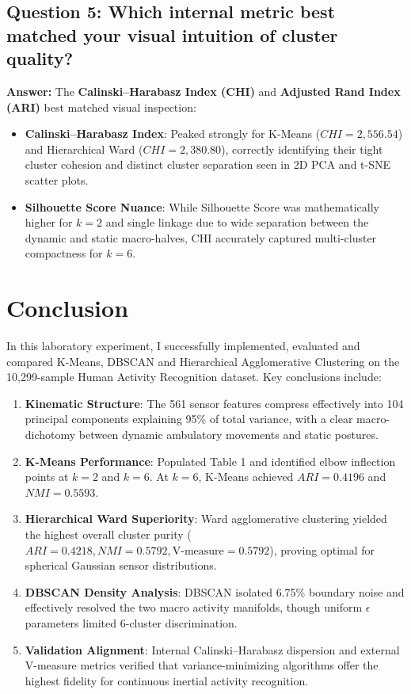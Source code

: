 \documentclass[12pt,a4paper]{article}
\begin{document}
\subsection*{Question 5: Which internal metric best matched your visual intuition of cluster quality?}
\textbf{Answer:} The \textbf{Calinski--Harabasz Index (CHI)} and \textbf{Adjusted Rand Index (ARI)} best matched visual inspection:
\begin{itemize}
\item \textbf{Calinski--Harabasz Index}: Peaked strongly for K-Means ($CHI = 2,556.54$) and Hierarchical Ward ($CHI = 2,380.80$), correctly identifying their tight cluster cohesion and distinct cluster separation seen in 2D PCA and t-SNE scatter plots.
\item \textbf{Silhouette Score Nuance}: While Silhouette Score was mathematically higher for $k=2$ and single linkage due to wide separation between the dynamic and static macro-halves, CHI accurately captured multi-cluster compactness for $k=6$.
\end{itemize}

\section{Conclusion}
In this laboratory experiment, I successfully implemented, evaluated and compared K-Means, DBSCAN and Hierarchical Agglomerative Clustering on the 10,299-sample Human Activity Recognition dataset. Key conclusions include:
\begin{enumerate}
\item \textbf{Kinematic Structure}: The 561 sensor features compress effectively into 104 principal components explaining 95\% of total variance, with a clear macro-dichotomy between dynamic ambulatory movements and static postures.
\item \textbf{K-Means Performance}: Populated Table 1 and identified elbow inflection points at $k=2$ and $k=6$. At $k=6$, K-Means achieved $ARI = 0.4196$ and $NMI = 0.5593$.
\item \textbf{Hierarchical Ward Superiority}: Ward agglomerative clustering yielded the highest overall cluster purity ($ARI = 0.4218, NMI = 0.5792, \text{V-measure} = 0.5792$), proving optimal for spherical Gaussian sensor distributions.
\item \textbf{DBSCAN Density Analysis}: DBSCAN isolated 6.75\% boundary noise and effectively resolved the two macro activity manifolds, though uniform $\epsilon$ parameters limited 6-cluster discrimination.
\item \textbf{Validation Alignment}: Internal Calinski--Harabasz dispersion and external V-measure metrics verified that variance-minimizing algorithms offer the highest fidelity for continuous inertial activity recognition.
\end{enumerate}
\end{document}
